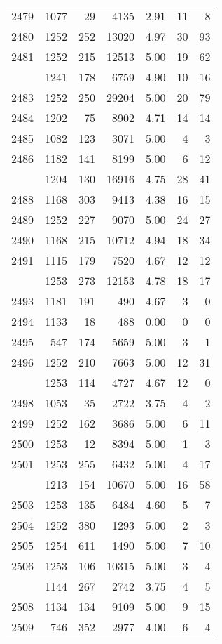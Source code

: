 \documentclass[
]{article}
\begin{document}
\begin{table}
\begin{tabular}[t]{lrrrrrr}
2479 & 1077 & 29 & 4135 & 2.91 & 11 & 8\\
2480 & 1252 & 252 & 13020 & 4.97 & 30 & 93\\
2481 & 1252 & 215 & 12513 & 5.00 & 19 & 62\\
\addlinespace
2482 & 1241 & 178 & 6759 & 4.90 & 10 & 16\\
2483 & 1252 & 250 & 29204 & 5.00 & 20 & 79\\
2484 & 1202 & 75 & 8902 & 4.71 & 14 & 14\\
2485 & 1082 & 123 & 3071 & 5.00 & 4 & 3\\
2486 & 1182 & 141 & 8199 & 5.00 & 6 & 12\\
\addlinespace
2487 & 1204 & 130 & 16916 & 4.75 & 28 & 41\\
2488 & 1168 & 303 & 9413 & 4.38 & 16 & 15\\
2489 & 1252 & 227 & 9070 & 5.00 & 24 & 27\\
2490 & 1168 & 215 & 10712 & 4.94 & 18 & 34\\
2491 & 1115 & 179 & 7520 & 4.67 & 12 & 12\\
\addlinespace
2492 & 1253 & 273 & 12153 & 4.78 & 18 & 17\\
2493 & 1181 & 191 & 490 & 4.67 & 3 & 0\\
2494 & 1133 & 18 & 488 & 0.00 & 0 & 0\\
2495 & 547 & 174 & 5659 & 5.00 & 3 & 1\\
2496 & 1252 & 210 & 7663 & 5.00 & 12 & 31\\
\addlinespace
2497 & 1253 & 114 & 4727 & 4.67 & 12 & 0\\
2498 & 1053 & 35 & 2722 & 3.75 & 4 & 2\\
2499 & 1252 & 162 & 3686 & 5.00 & 6 & 11\\
2500 & 1253 & 12 & 8394 & 5.00 & 1 & 3\\
2501 & 1253 & 255 & 6432 & 5.00 & 4 & 17\\
\addlinespace
2502 & 1213 & 154 & 10670 & 5.00 & 16 & 58\\
2503 & 1253 & 135 & 6484 & 4.60 & 5 & 7\\
2504 & 1252 & 380 & 1293 & 5.00 & 2 & 3\\
2505 & 1254 & 611 & 1490 & 5.00 & 7 & 10\\
2506 & 1253 & 106 & 10315 & 5.00 & 3 & 4\\
\addlinespace
2507 & 1144 & 267 & 2742 & 3.75 & 4 & 5\\
2508 & 1134 & 134 & 9109 & 5.00 & 9 & 15\\
2509 & 746 & 352 & 2977 & 4.00 & 6 & 4\\

\end{tabular}
\end{table}
\end{document}
